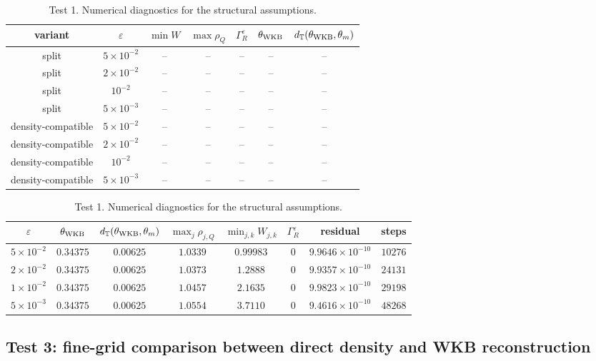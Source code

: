\documentclass[11pt]{article}
\begin{document}
\begin{table}[ht]
\centering
\caption{Test 1. Numerical diagnostics for the structural assumptions.}
\begin{tabular}{ccccccc}
\toprule
variant & $\varepsilon$ & $\min W$ & $\max\rho_Q$ & $\Gamma_R^\varepsilon$ & $\theta_{\rm WKB}$ & $d_{\mathbb T}(\theta_{\rm WKB},\theta_m)$\\
\midrule
split & $5\times10^{-2}$ & -- & -- & -- & -- & --\\
split & $2\times10^{-2}$ & -- & -- & -- & -- & --\\
split & $10^{-2}$ & -- & -- & -- & -- & --\\
split & $5\times10^{-3}$ & -- & -- & -- & -- & --\\
density-compatible & $5\times10^{-2}$ & -- & -- & -- & -- & --\\
density-compatible & $2\times10^{-2}$ & -- & -- & -- & -- & --\\
density-compatible & $10^{-2}$ & -- & -- & -- & -- & --\\
density-compatible & $5\times10^{-3}$ & -- & -- & -- & -- & --\\
\bottomrule
\end{tabular}
\end{table}
\begin{table}[ht]
\centering
\caption{Test 1. Numerical diagnostics for the structural assumptions.}
\label{tab:test1_structural_assumptions}
\begin{tabular}{cccccccc}
\toprule
$\varepsilon$
& $\theta_{\rm WKB}$
& $d_{\mathbb T}(\theta_{\rm WKB},\theta_m)$
& $\max_j \rho_{j,Q}$
& $\min_{j,k} W_{j,k}$
& $\Gamma_R^\varepsilon$
& residual
& steps \\
\midrule
$5\times10^{-2}$     & $0.34375$ & $0.00625$ & $1.0339$ & $0.99983$ & $0$ & $9.9646\times10^{-10}$ & $10276$ \\
$2\times10^{-2}$     & $0.34375$ & $0.00625$ & $1.0373$ & $1.2888$  & $0$ & $9.9357\times10^{-10}$ & $24131$ \\
$1\times10^{-2}$     & $0.34375$ & $0.00625$ & $1.0457$ & $2.1635$  & $0$ & $9.9823\times10^{-10}$ & $29198$ \\
$5\times10^{-3}$     & $0.34375$ & $0.00625$ & $1.0554$ & $3.7110$  & $0$ & $9.4616\times10^{-10}$ & $48268$ \\
\bottomrule
\end{tabular}
\end{table}



\subsection{Test 3: fine-grid comparison between direct density and WKB reconstruction}\label{subsec:test_fine_grid_n_new}
\end{document}
